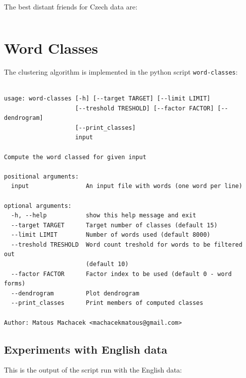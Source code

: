 \documentclass[12pt,a4paper]{article}
\begin{document}
\noindent
The best distant friends for Czech data are:
\begin{verbatim}

\end{verbatim}

\section{Word Classes}
The clustering algorithm is implemented in the python script \texttt{word-classes}:
\begin{verbatim}

usage: word-classes [-h] [--target TARGET] [--limit LIMIT]
                    [--treshold TRESHOLD] [--factor FACTOR] [--dendrogram]
                    [--print_classes]
                    input

Compute the word classed for given input

positional arguments:
  input                An input file with words (one word per line)

optional arguments:
  -h, --help           show this help message and exit
  --target TARGET      Target number of classes (default 15)
  --limit LIMIT        Number of words used (default 8000)
  --treshold TRESHOLD  Word count treshold for words to be filtered out
                       (default 10)
  --factor FACTOR      Factor index to be used (default 0 - word forms)
  --dendrogram         Plot dendrogram
  --print_classes      Print members of computed classes

Author: Matous Machacek <machacekmatous@gmail.com>
\end{verbatim}

\subsection{Experiments with English data}

This is the output of the script run with the English data:
\end{document}
